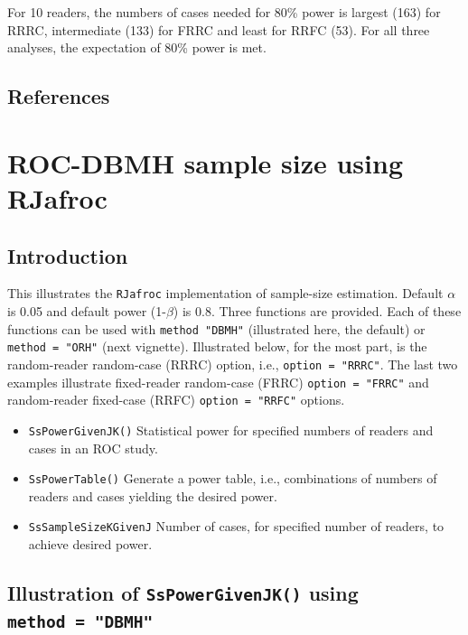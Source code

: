 \documentclass[
]{book}
\providecommand{\tightlist}{%
  \setlength{\itemsep}{0pt}\setlength{\parskip}{0pt}}
\begin{document}
For 10 readers, the numbers of cases needed for 80\% power is largest (163) for RRRC, intermediate (133) for FRRC and least for RRFC (53). For all three analyses, the expectation of 80\% power is met.

\hypertarget{references-7}{%
\section{References}\label{references-7}}

\hypertarget{SSRocDBMHRJafroc}{%
\chapter{ROC-DBMH sample size using RJafroc}\label{SSRocDBMHRJafroc}}

\hypertarget{introduction-8}{%
\section{Introduction}\label{introduction-8}}

This illustrates the \texttt{RJafroc} implementation of sample-size estimation. Default \(\alpha\) is 0.05 and default power (1-\(\beta\)) is 0.8. Three functions are provided. Each of these functions can be used with \texttt{method\ "DBMH"} (illustrated here, the default) or \texttt{method\ =\ "ORH"} (next vignette). Illustrated below, for the most part, is the random-reader random-case (RRRC) option, i.e., \texttt{option\ =\ "RRRC"}. The last two examples illustrate fixed-reader random-case (FRRC) \texttt{option\ =\ "FRRC"} and random-reader fixed-case (RRFC) \texttt{option\ =\ "RRFC"} options.

\begin{itemize}
\tightlist
\item
  \texttt{SsPowerGivenJK()}
  Statistical power for specified numbers of readers and cases in an ROC study.
\item
  \texttt{SsPowerTable()}
  Generate a power table, i.e., combinations of numbers of readers and cases yielding the desired power.
\item
  \texttt{SsSampleSizeKGivenJ}
  Number of cases, for specified number of readers, to achieve desired power.
\end{itemize}

\hypertarget{illustration-of-sspowergivenjk-using-method-dbmh}{%
\section{\texorpdfstring{Illustration of \texttt{SsPowerGivenJK()} using \texttt{method\ =\ "DBMH"}}{Illustration of SsPowerGivenJK() using method = "DBMH"}}\label{illustration-of-sspowergivenjk-using-method-dbmh}}
\end{document}
